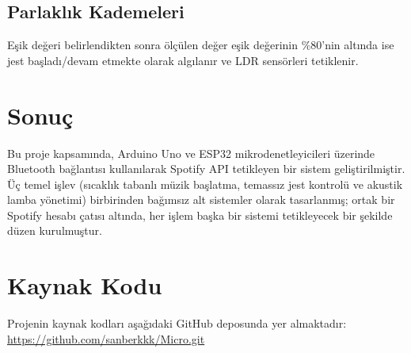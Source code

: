 \documentclass[12pt, a4paper]{article}
\begin{document}
\subsection{Parlaklık Kademeleri}

Eşik değeri belirlendikten sonra ölçülen değer eşik değerinin \%80'nin altında ise jest başladı/devam etmekte olarak algılanır ve LDR sensörleri tetiklenir.


\section{Sonuç}

Bu proje kapsamında, Arduino Uno ve ESP32 mikrodenetleyicileri üzerinde Bluetooth bağlantısı kullanılarak Spotify API tetikleyen bir sistem geliştirilmiştir. Üç temel işlev (sıcaklık tabanlı müzik
başlatma, temassız jest kontrolü ve akustik lamba yönetimi) birbirinden bağımsız
alt sistemler olarak tasarlanmış; ortak bir Spotify hesabı çatısı altında, her işlem başka bir sistemi tetikleyecek bir şekilde düzen kurulmuştur.



\appendix
\section{ Kaynak Kodu}

Projenin  kaynak kodları aşağıdaki GitHub deposunda yer almaktadır:\\
\url{https://github.com/sanberkkk/Micro.git}

% 
\end{document}
